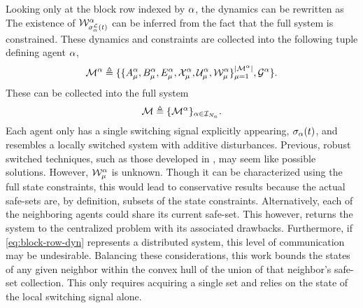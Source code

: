 Looking only at the block row indexed by $\alpha$, the dynamics can be rewritten as 
 The existence of $\wcon[\ssl[\agentidx](t)]^\agentidx$ can be inferred from the fact that the full system is constrained. These dynamics and constraints are collected into the following tuple defining agent $\alpha$,
$$\agent{\agentidx}\triangleq\{\{A^{\agentidx}_{\modeidx},B^\agentidx_{\modeidx}, E_{\modeidx}^\agentidx,\xcon[\modeidx]^\agentidx,\ucon[\modeidx]^\agentidx, \wcon[\modeidx]^\agentidx\}_{\modeidx=1}^{\nummodes[\agentidx]},\graph^\agentidx\}.$$
These can be collected into the full system
\begin{equation}\label{eq:agent_notation}
\mathcal{M}\triangleq\{\mathcal{M}^{\alpha}\}_{\alpha\in\mathcal{I}_{{N_a}}}.
\end{equation}
Each agent only has a single switching signal explicitly appearing, ${\sigma}_{\alpha}(t)$, and resembles a locally switched system with additive disturbances. Previous, robust switched techniques, such as those developed in \cite{Lavaei2021}, may seem like possible solutions. However, $\wcon[\modeidx]^\agentidx$ is unknown. Though it can be characterized using the full state constraints, this would lead to conservative results because the actual safe-sets are, by definition, subsets of the state constraints. Alternatively, each of the neighboring agents could share its current safe-set. This however, returns the system to the centralized problem with its associated drawbacks. Furthermore, if \autoref{eq:block-row-dyn} represents a distributed system, this level of communication may be undesirable. Balancing these considerations, this work bounds the states of any given neighbor within the convex hull of the union of that neighbor's safe-set collection. This only requires acquiring a single set and relies on the state of the local switching signal alone. 